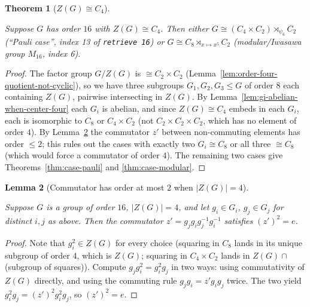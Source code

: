 \documentclass{article}
\newtheorem{theorem}{Theorem}[section]
\newtheorem{lemma}[theorem]{Lemma}
\theoremstyle{definition}
\newcommand{\lean}[1]{}
\newcommand{\leanok}{}
\newcommand{\leanfile}[1]{}
\newcommand{\uses}[1]{}
\begin{document}
\begin{theorem}[$Z(G) \cong C_4$]
    \label{thm:center-four-cyclic}
    \uses{thm:case-pauli,thm:case-modular,
          lem:gi-abelian-when-center-four,
          lem:order-four-quotient-not-cyclic,
          lem:commutator-has-order-two}
    Suppose $G$ has order $16$ with $Z(G) \cong C_4$. Then either
    $G \cong (C_4 \times C_2) \rtimes_{\psi_6} C_2$ (``Pauli case'',
    index 13 of \texttt{retrieve 16}) or $G \cong
    C_8 \rtimes_{x \mapsto x^5} C_2$ (modular/Iwasawa group $M_{16}$,
    index 6).
\end{theorem}
\begin{proof}
    \uses{thm:case-pauli,thm:case-modular,
          lem:gi-abelian-when-center-four,
          lem:commutator-has-order-two,
          lem:order-four-quotient-not-cyclic}
    The factor group $G/Z(G)$ is $\cong C_2 \times C_2$
    (Lemma~\ref{lem:order-four-quotient-not-cyclic}), so we have three
    subgroups $G_1, G_2, G_3 \le G$ of order $8$ each containing $Z(G)$,
    pairwise intersecting in $Z(G)$. By
    Lemma~\ref{lem:gi-abelian-when-center-four} each $G_i$ is abelian, and
    since $Z(G) \cong C_4$ embeds in each $G_i$, each is isomorphic to $C_8$
    or $C_4 \times C_2$ (not $C_2 \times C_2 \times C_2$, which has no
    element of order $4$). By Lemma~\ref{lem:commutator-has-order-two} the
    commutator $z'$ between non-commuting elements has order $\le 2$; this
    rules out the cases with exactly two $G_i \cong C_8$ or all three
    $\cong C_8$ (which would force a commutator of order $4$). The remaining
    two cases give Theorems~\ref{thm:case-pauli} and \ref{thm:case-modular}.
\end{proof}

\begin{lemma}[Commutator has order at most $2$ when $|Z(G)| = 4$]
    \label{lem:commutator-has-order-two}
    \lean{OrderSixteen.Prelim.commutator_has_order_two}
    \leanfile{M2rGroup7/SixteenCase.lean}
    \uses{lem:commutator-in-center-when-quotient-abelian}
    \leanok
    Suppose $G$ is a group of order $16$, $|Z(G)| = 4$, and let $g_i \in G_i$,
    $g_j \in G_j$ for distinct $i, j$ as above. Then the commutator
    $z' = g_j g_i g_j^{-1} g_i^{-1}$ satisfies $(z')^2 = e$.
\end{lemma}
\begin{proof}
    \uses{lem:commutator-in-center-when-quotient-abelian}
    Note that $g_i^2 \in Z(G)$ for every choice (squaring in $C_8$ lands in
    its unique subgroup of order $4$, which is $Z(G)$; squaring in
    $C_4 \times C_2$ lands in $Z(G) \cap$ (subgroup of squares)). Compute
    $g_j g_i^2 = g_i^2 g_j$ in two ways: using commutativity of $Z(G)$
    directly, and using the commuting rule $g_j g_i = z' g_i g_j$ twice. The
    two yield $g_i^2 g_j = (z')^2 g_i^2 g_j$, so $(z')^2 = e$.
\end{proof}
\end{document}
